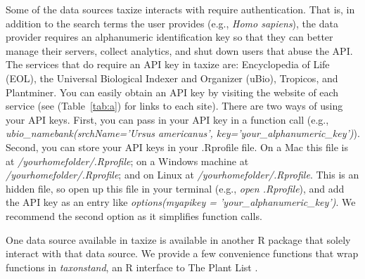 \documentclass[letterpaper,superscriptaddress,showkeys,longbibliography,10pt]{revtex4-1}\usepackage{graphicx, color}
\begin{document}
Some of the data sources taxize interacts with require authentication. That is, in addition to the search terms the user provides (e.g., \emph{Homo sapiens}), the data provider requires an alphanumeric identification key so that they can better manage their servers, collect analytics, and shut down users that abuse the API. The services that do require an API key in taxize are: Encyclopedia of Life (EOL), the Universal Biological Indexer and Organizer (uBio), Tropicos, and Plantminer. You can easily obtain an API key by visiting the website of each service (see (Table~\ref{tab:a}) for links to each site). There are two ways of using your API keys. First, you can pass in your API key in a function call (e.g., \emph{ubio\_namebank(srchName='Ursus americanus', key='your\_alphanumeric\_key')}). Second, you can store your API keys in your .Rprofile file. On a Mac this file is at \emph{/yourhomefolder/.Rprofile}; on a Windows machine at \emph{/yourhomefolder/.Rprofile}; and on Linux at \emph{/yourhomefolder/.Rprofile}. This is an hidden file, so open up this file in your terminal (e.g., \emph{open .Rprofile}), and add the API key as an entry like \emph{options(myapikey = 'your\_alphanumeric\_key')}. We recommend the second option as it simplifies function calls. 

One data source available in taxize is available in another R package that solely interact with that data source. We provide a few convenience functions that wrap functions in \emph{taxonstand}, an R interface to The Plant List \cite{theplantlist}. 
\end{document}
